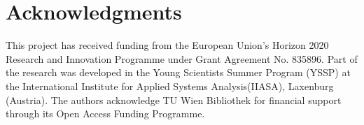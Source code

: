 \documentclass[review]{elsarticle}
\begin{document}
\section*{Acknowledgments}
This project has received funding from the European Union's Horizon 2020 Research and Innovation Programme under Grant Agreement No. 835896. Part of the research was developed in the Young Scientists Summer Program (YSSP) at the International Institute for Applied Systems Analysis(IIASA), Laxenburg (Austria). The authors acknowledge TU Wien Bibliothek for financial support through its Open Access Funding Programme. 


\end{document}
